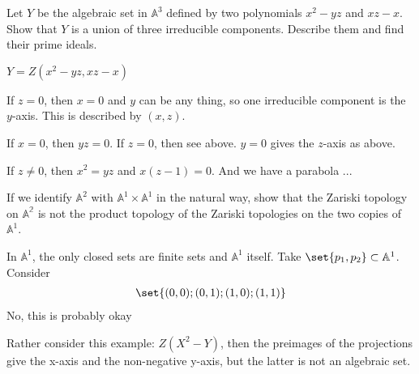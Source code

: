 \begin{exercise}
    Let \(Y\) be the algebraic set in \(\mathbb{A}^3\) defined by two polynomials \(x^2 - yz\) and \(xz - x\). Show that \(Y\) is a union of three irreducible components. Describe them and find their prime ideals.
\end{exercise}
\begin{solution}
    \(Y = Z(x^2 - yz, xz - x)\)

    If \(z = 0\), then \(x = 0\) and \(y\) can be any thing, so one irreducible component is the \(y\)-axis. This is described by \((x, z)\).

    If \(x = 0\), then \(yz = 0\). If \(z = 0\), then see above. \(y = 0\) gives the \(z\)-axis as above.

    If \(z \neq 0\), then \(x^2 = yz\) and \(x(z - 1) = 0\). And we have a parabola ...
\end{solution}

    

\begin{exercise}
    If we identify \(\mathbb{A}^2\) with \(\mathbb{A}^1 \times \mathbb{A}^1\) in the natural way, show that the Zariski topology on \(\mathbb{A^2}\) is not the product topology of the Zariski topologies on the two copies of \(\mathbb{A}^1\).
\end{exercise}
\begin{solution}
    In \(\mathbb{A}^1\), the only closed sets are finite sets and \(\mathbb{A}^1\) itself. Take \(\set{p_1, p_2} \subset \mathbb{A}^1\). Consider
    \begin{align*}
        \set{(0, 0); (0, 1); (1, 0); (1, 1)}
    \end{align*}
    No, this is probably okay

    Rather consider this example: \(Z(X^2 - Y)\), then the preimages of the projections give the x-axis and the non-negative y-axis, but the latter is not an algebraic set.
\end{solution}